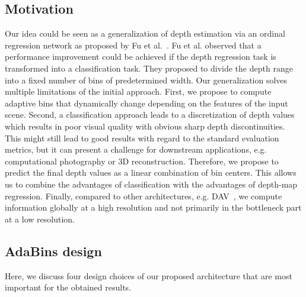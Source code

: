 \documentclass[final]{cvpr}
\begin{document}
\subsection{Motivation}
Our idea could be seen as a generalization of depth estimation via an ordinal regression network as proposed by Fu et al.~\cite{Fu2018DeepOR}. Fu et al. observed that a performance improvement could be achieved if the depth regression task is transformed into a classification task. They proposed to divide the depth range into a fixed number of bins of predetermined width. Our generalization solves multiple limitations of the initial approach.
First, we propose to compute adaptive bins that dynamically change depending on the features of the input scene. 
Second, a classification approach leads to a discretization of depth values which results in poor visual quality with obvious sharp depth discontinuities. This might still lead to good results with regard to the standard evaluation metrics, but it can present a challenge for downstream applications, e.g. computational photography or 3D reconstruction. Therefore, we propose to predict the final depth values as a linear combination of bin centers. This allows us to combine the advantages of classification with the advantages of depth-map regression.
Finally, compared to other architectures, e.g. DAV~\cite{dav_huynh2020guiding}, we compute information globally at a high resolution and not primarily in the bottleneck part at a low resolution.


\subsection{AdaBins design}
\label{sec:adabins-design-choices}

Here, we discuss four design choices of our proposed architecture that are most important for the obtained results.
\end{document}
